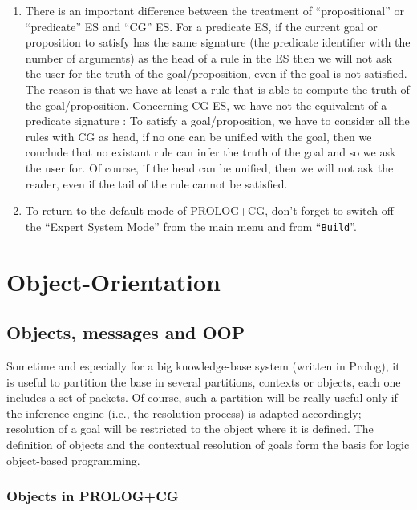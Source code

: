 \documentclass{book}
\begin{document}
\begin{enumerate}

\item There is an important difference between the treatment of
``propositional'' or ``predicate'' ES and ``CG'' ES. For a predicate
ES, if the current goal or proposition to satisfy has the same
signature (the predicate identifier with the number of arguments) as
the head of a rule in the ES then we will not ask the user for the
truth of the goal/proposition, even if the goal is not satisfied. The
reason is that we have at least a rule that is able to compute the
truth of the goal/proposition. Concerning CG ES, we have not the
equivalent of a predicate signature : To satisfy a goal/proposition,
we have to consider all the rules with CG as head, if no one can be
unified with the goal, then we conclude that no existant rule can
infer the truth of the goal and so we ask the user for. Of course, if
the head can be unified, then we will not ask the reader, even if the
tail of the rule cannot be satisfied.

\item To return to the default mode of PROLOG+CG, don't forget to
switch off the ``Expert System Mode'' from the main menu and from
``\texttt{Build}''.

\end{enumerate}

\chapter{Object-Orientation}


\section{Objects, messages and OOP}\label{Sec:OO}

Sometime and especially for a big knowledge-base system (written in
Prolog), it is useful to partition the base in several partitions,
contexts or objects, each one includes a set of packets. Of course,
such a partition will be really useful only if the inference engine
(i.e., the resolution process) is adapted accordingly; resolution of a
goal will be restricted to the object where it is defined.  The
definition of objects and the contextual resolution of goals form the
basis for logic object-based programming.

\subsection{Objects in PROLOG+CG}
\end{document}

